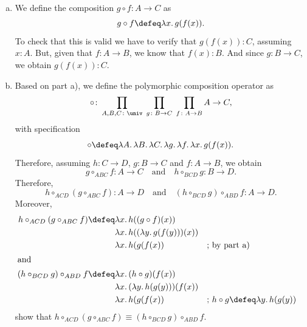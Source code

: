 \begin{solution}${}$
    \begin{enumerate}[a)]
        \item We define the composition $g\circ f\colon A\to C$ as
        \[
            g\circ f \defeq\lambda x.\,g(f(x)).
        \]
        To check that this is valid we have to verify that $g(f(x))\colon C$, assuming $x\colon A$. But, given that $f\colon A\to B$, we know that $f(x)\colon B$. And since $g\colon B\to C$, we obtain $g(f(x))\colon C$.
        
        \item Based on part a), we define the polymorphic composition operator as
        \[
            \circ\colon \prod_{A,B,C\colon\univ}\;
                \prod_{g\colon B\to C}\;
                \prod_{f\colon A\to B}A\to C,
        \]
        with specification
        \[
            \circ \defeq
                \lambda A.\,\lambda B.\,\lambda C
                .\,\lambda g.\,\lambda f.\,\lambda x
                .\,g(f(x)).
        \]
        Therefore, assuming $h\colon C\to D$, $g\colon B\to C$ and $f\colon A\to B$, we obtain
        \[
            g\circ_{ABC}f\colon A\to C\quad\text{and}\quad
            h\circ_{BCD}g\colon B\to D.
        \]
        Therefore,
        \[
            h\circ_{ACD}(g\circ_{ABC}f)\colon A\to D\quad\text{and}\quad
            (h\circ_{BCD}g)\circ_{ABD}f\colon A\to D.
        \]
        Moreover,
        \begin{align*}
            h\circ_{ACD}(g\circ_{ABC}f)
                &\defeq \lambda x.\,h((g\circ f)(x))\\
                &\phantom\defeq
                    \lambda x.\,h((\lambda y.\,g(f(y)))(x))\\
                &\phantom\defeq\lambda x.\,h(g(f(x))
                    &&\text{; by part a)}\\
        \intertext{and}
            (h\circ_{BCD}g)\circ_{ABD}f
                &\defeq\lambda x.\,(h\circ g)(f(x))\\
                &\phantom\defeq
                    \lambda x.\,(\lambda y.\,h(g(y)))(f(x))\\
                &\phantom\defeq\lambda x.\,h(g(f(x))
                    &&\text{; $h\circ g \defeq\lambda y.\,h(g(y))$}
        \end{align*}
        show that $h\circ_{ACD}(g\circ_{ABC}f)\equiv(h\circ_{BCD}g)\circ_{ABD}f$.
    \end{enumerate}
\end{solution}

